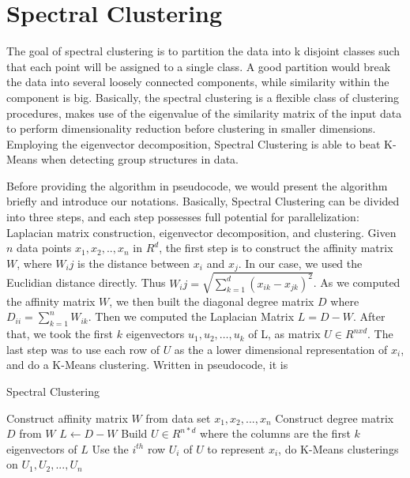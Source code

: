 \documentclass{acm_proc_article-sp}
\begin{document}
\section{Spectral Clustering}
The goal of spectral clustering is to partition the data into k disjoint classes such that each point will be assigned to a single class. A good partition would break the data into several loosely connected components, while similarity within the component is big.
Basically, the spectral clustering is a flexible class of clustering procedures, makes use of the eigenvalue of the similarity matrix of the input data to perform dimensionality reduction before clustering in smaller dimensions. Employing the eigenvector decomposition, Spectral Clustering is able to beat K-Means when detecting group structures in data.

Before providing the algorithm in pseudocode, we would present the algorithm briefly and introduce our notations. Basically, Spectral Clustering can be divided into three steps, and each step possesses full potential for parallelization: Laplacian matrix construction, eigenvector decomposition, and clustering. Given $n$ data points $x_1, x_2, .., x_n$ in $R^d$, the first step is to construct the affinity matrix $W$, where $W_ij$ is the distance between $x_i$ and $x_j$. In our case, we used the Euclidian distance directly. Thus $W_ij = \sqrt{\sum_{k=1}^d(x_{ik} - x_{jk})^2}$. As we computed the affinity matrix $W$, we then built the diagonal degree matrix $D$ where $D_{ii} = \sum_{k=1}^nW_{ik}$. Then we computed the Laplacian Matrix $L = D - W$. After that, we took the first $k$ eigenvectors $u_1, u_2, …, u_k$ of L, as matrix $U \in R^{nxd}$. The last step was to use each row of $U$ as the a lower dimensional representation of $x_i$, and do a K-Means clustering. 
Written in pseudocode, it is
\begin{algorithm}
\caption{Spectral Clustering}
\label{CHalgorithm}
\begin{algorithmic}[1]
\State Construct affinity matrix $W$ from data set $x_1, x_2, ..., x_n$
\State Construct degree matrix $D$ from $W$
\State $L \leftarrow D - W$
\State Build $U \in R^{n*d}$ where the columns are the first $k$ eigenvectors of $L$ 
\State Use the $i^{th}$ row $U_i$ of $U$ to represent $x_i$, do K-Means clusterings on $U_1, U_2, ..., U_n$
\end{algorithmic}
\end{algorithm}
\end{document}
